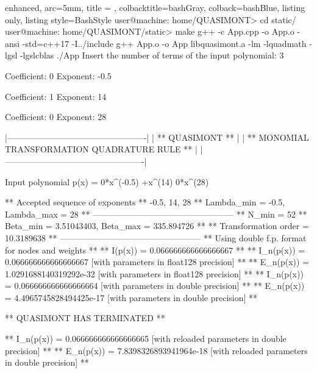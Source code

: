 \documentclass[a4paper, twosided]{book}
\begin{document}
\vspace{0.2cm}
\begin{tcblisting}{enhanced,
                   arc=5mm,
                   title = \color{black}{\large \ttfamily Execution of external source code using QUASIMONT' static library},
                   colbacktitle=bashGray,
                   colback=bashBlue,
                   listing only,
                   listing style=BashStyle}
user@machine: home/QUASIMONT> cd static/
user@machine: home/QUASIMONT/static> make
g++  -c App.cpp -o App.o -ansi -std=c++17 -I../include
g++ App.o -o App libquasimont.a -lm -lquadmath -lgsl -lgslcblas
./App
Insert the number of terms of the input polynomial: 3

Coefficient: 0
Exponent: -0.5

Coefficient: 1
Exponent:   14

Coefficient: 0
Exponent:   28

    |-------------------------------------------------|
    |                 ** QUASIMONT **                 |
    |  ** MONOMIAL TRANSFORMATION QUADRATURE RULE **  |
    |-------------------------------------------------|
    
 Input polynomial p(x) =  0*x^(-0.5) +x^(14)  0*x^(28)

 ** Accepted sequence of exponents ** 
    {-0.5, 14, 28}
 ** Lambda_min = -0.5, Lambda_max = 28 **
 --------------------------------------------------
 ** N_min = 52
 ** Beta_min = 3.51043403, Beta_max = 335.894726 **
 ** Transformation order = 10.3189638 **
 --------------------------------------------------
 ** Using double f.p. format for nodes and weights **
 ** I(p(x))   = 0.066666666666666667 **
 ** I_n(p(x)) = 0.066666666666666667    [with parameters in float128 precision] **
 ** E_n(p(x)) = 1.0291688140319292e-32  [with parameters in float128 precision] **
 ** I_n(p(x)) = 0.066666666666666664    [with parameters in double precision] **
 ** E_n(p(x)) = 4.4965745828494425e-17  [with parameters in double precision] **

 ** QUASIMONT HAS TERMINATED **

 ** I_n(p(x)) = 0.066666666666666665    [with reloaded parameters in double precision] **
 ** E_n(p(x)) = 7.8398326893941964e-18  [with reloaded parameters in double precision] **
\end{tcblisting}
\vspace{0.3cm}
\end{document}
